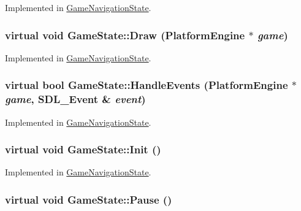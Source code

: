 Implemented in \hyperlink{class_game_navigation_state_f93a7dbb7eac4b14a6d59cbca32b9abd}{GameNavigationState}.\hypertarget{class_game_state_7333dda0f49b3fa1c01cd3295f853024}{
\subsubsection[{Draw}]{\setlength{\rightskip}{0pt plus 5cm}virtual void GameState::Draw ({\bf PlatformEngine} $\ast$ {\em game})}}
\label{dd/d87/class_game_state_7333dda0f49b3fa1c01cd3295f853024}




Implemented in \hyperlink{class_game_navigation_state_a37dce070a906454c512192c067fda09}{GameNavigationState}.\hypertarget{class_game_state_de7bd9bda91253614322ca0ea77b7a14}{
\subsubsection[{HandleEvents}]{\setlength{\rightskip}{0pt plus 5cm}virtual bool GameState::HandleEvents ({\bf PlatformEngine} $\ast$ {\em game}, \/  SDL\_\-Event \& {\em event})}}
\label{dd/d87/class_game_state_de7bd9bda91253614322ca0ea77b7a14}




Implemented in \hyperlink{class_game_navigation_state_6e7c13d35a33478673c62ae55394cfdc}{GameNavigationState}.\hypertarget{class_game_state_eec488593bae214c0f738bd64dafba32}{
\subsubsection[{Init}]{\setlength{\rightskip}{0pt plus 5cm}virtual void GameState::Init ()}}
\label{dd/d87/class_game_state_eec488593bae214c0f738bd64dafba32}




Implemented in \hyperlink{class_game_navigation_state_8f613860bf544476ab9cff9fb7f98201}{GameNavigationState}.\hypertarget{class_game_state_1f4d2b5a2e4dcb7645e3e7a5735926a6}{
\subsubsection[{Pause}]{\setlength{\rightskip}{0pt plus 5cm}virtual void GameState::Pause ()}}
\label{dd/d87/class_game_state_1f4d2b5a2e4dcb7645e3e7a5735926a6}




